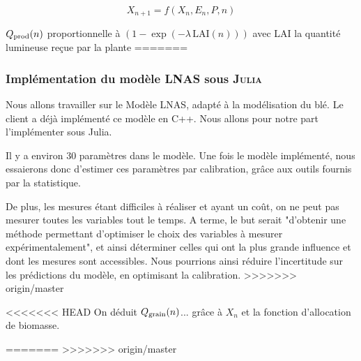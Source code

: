 \begin{equation}
  X_{n+1} = f(X_n,E_n,P,n)
\end{equation} 

$Q_{\text{prod}}(n)$ proportionnelle à $(1-\exp{(-\lambda \, \text{LAI}(n))})$ 
avec LAI la quantité lumineuse reçue par la plante
=======
\subsubsection{Implémentation du modèle LNAS sous \textsc{Julia}}
Nous allons travailler sur le Modèle LNAS, adapté à la modélisation du blé. 
Le client a déjà implémenté ce modèle en C++. 
Nous allons pour notre part l'implémenter sous Julia.

Il y a environ 30 paramètres dans le modèle. Une fois le modèle implémenté, nous essaierons donc d'estimer ces paramètres par calibration, grâce aux outils fournis par la statistique.

De plus, les mesures étant difficiles à réaliser et ayant un coût, on ne peut pas mesurer toutes les variables tout le temps. A terme, le but serait "d'obtenir une méthode permettant d'optimiser le choix des variables à mesurer expérimentalement", et ainsi déterminer celles qui ont la plus grande influence et dont les mesures sont accessibles. Nous pourrions ainsi réduire l'incertitude sur les prédictions du modèle, en optimisant la calibration.
>>>>>>> origin/master


<<<<<<< HEAD
On déduit $Q_{\text{grain}}(n)$... grâce à $X_n$ et la fonction d'allocation de biomasse.


=======
>>>>>>> origin/master
